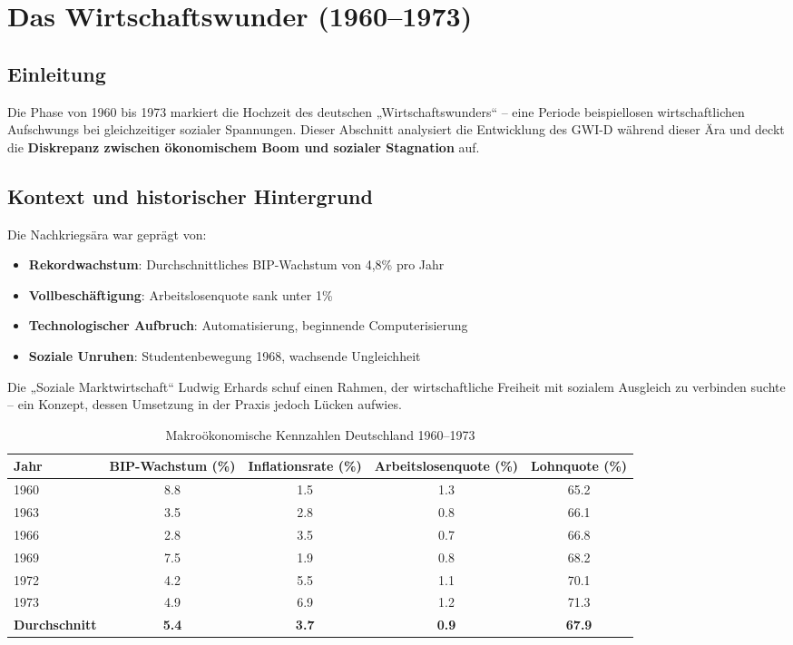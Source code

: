 \chapter{Das Wirtschaftswunder (1960–1973)}
\label{chap:wirtschaftswunder}

\section*{Einleitung}
Die Phase von 1960 bis 1973 markiert die Hochzeit des deutschen „Wirtschaftswunders“ – eine Periode beispiellosen wirtschaftlichen Aufschwungs bei gleichzeitiger sozialer Spannungen. Dieser Abschnitt analysiert die Entwicklung des GWI-D während dieser Ära und deckt die \textbf{Diskrepanz zwischen ökonomischem Boom und sozialer Stagnation} auf.

\section{Kontext und historischer Hintergrund}

Die Nachkriegsära war geprägt von:
\begin{itemize}
    \item \textbf{Rekordwachstum}: Durchschnittliches BIP-Wachstum von 4,8\% pro Jahr
    \item \textbf{Vollbeschäftigung}: Arbeitslosenquote sank unter 1\% 
    \item \textbf{Technologischer Aufbruch}: Automatisierung, beginnende Computerisierung
    \item \textbf{Soziale Unruhen}: Studentenbewegung 1968, wachsende Ungleichheit
\end{itemize}

Die „Soziale Marktwirtschaft“ Ludwig Erhards schuf einen Rahmen, der wirtschaftliche Freiheit mit sozialem Ausgleich zu verbinden suchte – ein Konzept, dessen Umsetzung in der Praxis jedoch Lücken aufwies.

\begin{table}[ht]
    \centering
    \caption{Makroökonomische Kennzahlen Deutschland 1960–1973}
    \label{tab:makro_wirtschaftswunder}
    \begin{tabular}{lcccc}
        \toprule
        \textbf{Jahr} & \textbf{BIP-Wachstum (\%)} & \textbf{Inflationsrate (\%)} & \textbf{Arbeitslosenquote (\%)} & \textbf{Lohnquote (\%)} \\
        \midrule
        1960 & 8.8 & 1.5 & 1.3 & 65.2 \\
        1963 & 3.5 & 2.8 & 0.8 & 66.1 \\
        1966 & 2.8 & 3.5 & 0.7 & 66.8 \\
        1969 & 7.5 & 1.9 & 0.8 & 68.2 \\
        1972 & 4.2 & 5.5 & 1.1 & 70.1 \\
        1973 & 4.9 & 6.9 & 1.2 & 71.3 \\
        \midrule
        \textbf{Durchschnitt} & \textbf{5.4} & \textbf{3.7} & \textbf{0.9} & \textbf{67.9} \\
        \bottomrule
    \end{tabular}
\end{table}

